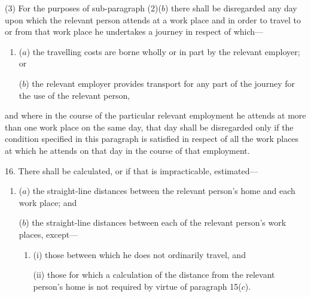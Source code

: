 \documentclass[a4paper]{article}
\begin{document}
(3) For the purposes of sub-paragraph (2)($b$) there shall be disregarded any day upon which the relevant person attends at a work place and in order to travel to or from that work place he undertakes a journey in respect of which—
\begin{enumerate}\item[]
($a$) the travelling costs are borne wholly or in part by the relevant employer; or

($b$) the relevant employer provides transport for any part of the journey for the use of the relevant person,
\end{enumerate}
and where in the course of the particular relevant employment he attends at more than one work place on the same day, that day shall be disregarded only if the condition specified in this paragraph is satisfied in respect of all the work places at which he attends on that day in the course of that employment.

\medskip

16.  There shall be calculated, or if that is impracticable, estimated—
\begin{enumerate}\item[]
($a$) the straight-line distances between the relevant person’s home and each work place; and

($b$) the straight-line distances between each of the relevant person’s work places, except—
\begin{enumerate}\item[]
(i) those between which he does not ordinarily travel, and

(ii) those for which a calculation of the distance from the relevant person’s home is not required by virtue of paragraph 15($c$).
\end{enumerate}
\end{enumerate}

\medskip

\end{document}
